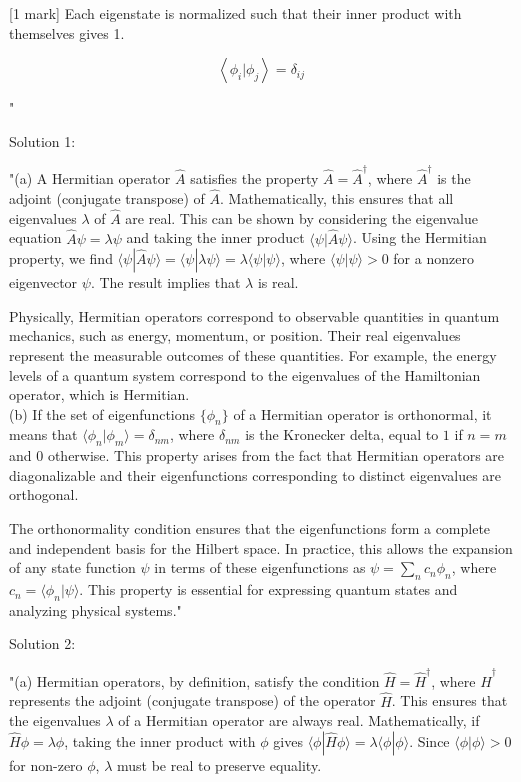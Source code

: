 [1 mark] Each eigenstate is normalized such that their inner product with themselves gives 1. 

\[ \left< \phi_i | \phi_j \right> = \delta_{ij} \]

"

Solution 1: 

"(a) A Hermitian operator $\hat{A}$ satisfies the property $\hat{A} = \hat{A}^\dagger$, where $\hat{A}^\dagger$ is the adjoint (conjugate transpose) of $\hat{A}$. Mathematically, this ensures that all eigenvalues $\lambda$ of $\hat{A}$ are real. This can be shown by considering the eigenvalue equation $\hat{A}\psi = \lambda\psi$ and taking the inner product $\langle \psi | \hat{A} \psi \rangle$. Using the Hermitian property, we find $\langle \psi | \hat{A} \psi \rangle = \langle \psi | \lambda \psi \rangle = \lambda \langle \psi | \psi \rangle$, where $\langle \psi | \psi \rangle > 0$ for a nonzero eigenvector $\psi$. The result implies that $\lambda$ is real.

Physically, Hermitian operators correspond to observable quantities in quantum mechanics, such as energy, momentum, or position. Their real eigenvalues represent the measurable outcomes of these quantities. For example, the energy levels of a quantum system correspond to the eigenvalues of the Hamiltonian operator, which is Hermitian. \\

(b) If the set of eigenfunctions $\{\phi_n\}$ of a Hermitian operator is orthonormal, it means that $\langle \phi_n | \phi_m \rangle = \delta_{nm}$, where $\delta_{nm}$ is the Kronecker delta, equal to $1$ if $n = m$ and $0$ otherwise. This property arises from the fact that Hermitian operators are diagonalizable and their eigenfunctions corresponding to distinct eigenvalues are orthogonal. 

The orthonormality condition ensures that the eigenfunctions form a complete and independent basis for the Hilbert space. In practice, this allows the expansion of any state function $\psi$ in terms of these eigenfunctions as $\psi = \sum_n c_n \phi_n$, where $c_n = \langle \phi_n | \psi \rangle$. This property is essential for expressing quantum states and analyzing physical systems."

Solution 2: 

"(a) Hermitian operators, by definition, satisfy the condition $\hat{H} = \hat{H}^\dagger$, where $\hat{H}^\dagger$ represents the adjoint (conjugate transpose) of the operator $\hat{H}$. This ensures that the eigenvalues $\lambda$ of a Hermitian operator are always real. Mathematically, if $\hat{H} \phi = \lambda \phi$, taking the inner product with $\phi$ gives $\langle \phi | \hat{H} \phi \rangle = \lambda \langle \phi | \phi \rangle$. Since $\langle \phi | \phi \rangle > 0$ for non-zero $\phi$, $\lambda$ must be real to preserve equality. 

